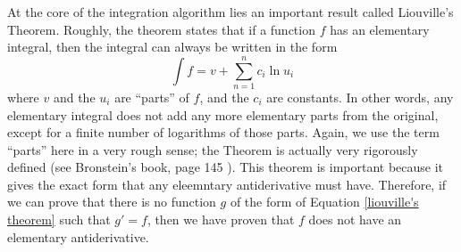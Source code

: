 At the core of the \gls{integration} algorithm lies an important result
called Liouville's Theorem.  Roughly, the theorem states that if a
function $f$ has an \gls{elementary} integral, then the integral can
always be written in the form
\begin{equation}
\label{liouville's theorem}
\int{f} = v + \sum_{n=1}^n{c_i\ln{u_i}}
\end{equation}
where $v$ and the $u_i$ are ``parts'' of $f$, and the $c_i$ are
constants.  In other words, any \gls{elementary} integral does not add
any more \gls{elementary} parts from the original, except for a finite
number of logarithms of those parts.  Again, we use the term ``parts''
here in a very rough sense; the Theorem is actually very rigorously
defined (see Bronstein's book, page 145 \cite{bronstein2005symbolic}). 
This theorem is important because it gives the exact form that any
eleemntary antiderivative must have. Therefore, if we can prove that
there is no function $g$ of the form of Equation \ref{liouville's
theorem} such that $g'=f$, then we have proven that $f$ does not have an
\gls{elementary} antiderivative. 